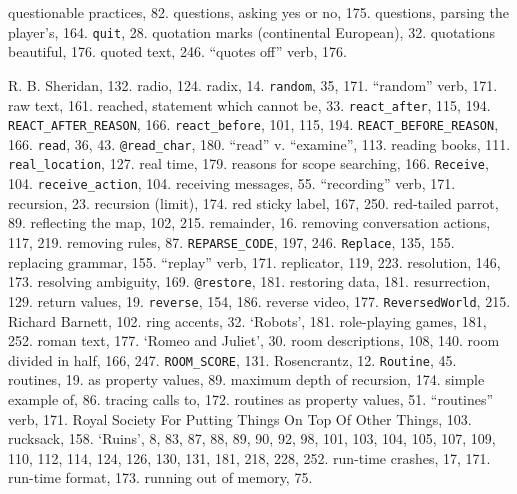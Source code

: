 questionable practices, 82.
questions, asking yes or no, 175.
questions, parsing the player's, 164.
{{\tt quit}}, 28.
quotation marks (continental European), 32.
quotations beautiful, 176.
quoted text, 246.
``quotes off'' verb, 176.

R. B. Sheridan, 132.
radio, 124.
radix, 14.
{{\tt random}}, 35, 171.
``random'' verb, 171.
raw text, 161.
reached, statement which cannot be, 33.
{{\tt react\_after}}, 115, 194.
{{\tt REACT\_AFTER\_REASON}}, 166.
{{\tt react\_before}}, 101, 115, 194.
{{\tt REACT\_BEFORE\_REASON}}, 166.
{{\tt read}}, 36, 43.
{{\tt @read\_char}}, 180.
``read'' v. ``examine'', 113.
reading books, 111.
{{\tt real\_location}}, 127.
real time, 179.
reasons for scope searching, 166.
{{\tt Receive}}, 104.
{{\tt receive\_action}}, 104.
receiving messages, 55.
``recording'' verb, 171.
recursion, 23.
recursion (limit), 174.
red sticky label, 167, 250.
red-tailed parrot, 89.
reflecting the map, 102, 215.
remainder, 16.
removing conversation actions, 117, 219.
removing rules, 87.
{{\tt REPARSE\_CODE}}, 197, 246.
{{\tt Replace}}, 135, 155.
replacing grammar, 155.
``replay'' verb, 171.
replicator, 119, 223.
resolution, 146, 173.
resolving ambiguity, 169.
{{\tt @restore}}, 181.
restoring data, 181.
resurrection, 129.
return values, 19.
{{\tt reverse}}, 154, 186.
reverse video, 177.
{{\tt ReversedWorld}}, 215.
Richard Barnett, 102.
ring accents, 32.
`Robots', 181.
role-playing games, 181, 252.
roman text, 177.
`Romeo and Juliet', 30.
room descriptions, 108, 140.
room divided in half, 166, 247.
{{\tt ROOM\_SCORE}}, 131.
Rosencrantz, 12.
{{\tt Routine}}, 45.
routines, 19.
\quad  as property values, 89.
\quad  maximum depth of recursion, 174.
\quad  simple example of, 86.
\quad  tracing calls to, 172.
routines as property values, 51.
``routines'' verb, 171.
Royal Society For Putting Things On Top Of Other Things, 103.
rucksack, 158.
`Ruins', 8, 83, 87, 88, 89, 90, 92, 98, 101, 103, 104, 105, 107, 109, 110, 112, 114, 124, 126, 130, 131, 181, 218, 228, 252.
run-time crashes, 17, 171.
run-time format, 173.
running out of memory, 75.

